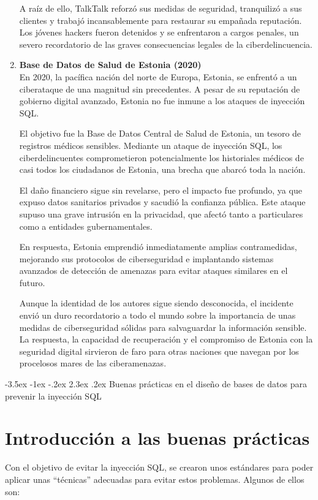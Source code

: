 \documentclass[11pt]{report}
\makeatletter
\renewcommand\chapter{\@startsection{chapter}{0}{\z@}%
    {-3.5ex \@plus -1ex \@minus -.2ex}%
    {2.3ex \@plus.2ex}%
    {\normalfont\Large\bfseries}}
\makeatother
\begin{document}
\begin{enumerate}
  A raíz de ello, TalkTalk reforzó sus medidas de seguridad, tranquilizó a sus clientes y trabajó incansablemente para restaurar su empañada reputación. Los jóvenes
  hackers fueron detenidos y se enfrentaron a cargos penales, un severo recordatorio de las graves consecuencias legales de la ciberdelincuencia.

  \item \textbf{Base de Datos de Salud de Estonia (2020)} \\
  En 2020, la pacífica nación del norte de Europa, Estonia, se enfrentó a un ciberataque de una magnitud sin precedentes. A pesar de su reputación de gobierno digital avanzado,
  Estonia no fue inmune a los ataques de inyección SQL.

  El objetivo fue la Base de Datos Central de Salud de Estonia, un tesoro de registros médicos sensibles. Mediante un ataque de inyección SQL, los ciberdelincuentes comprometieron
  potencialmente los historiales médicos de casi todos los ciudadanos de Estonia, una brecha que abarcó toda la nación.
  
  El daño financiero sigue sin revelarse, pero el impacto fue profundo, ya que expuso datos sanitarios privados y sacudió la confianza pública. Este ataque supuso una grave intrusión
  en la privacidad, que afectó tanto a particulares como a entidades gubernamentales.
  
  En respuesta, Estonia emprendió inmediatamente amplias contramedidas, mejorando sus protocolos de ciberseguridad e implantando sistemas avanzados de detección de amenazas para evitar
  ataques similares en el futuro.
  
  Aunque la identidad de los autores sigue siendo desconocida, el incidente envió un duro recordatorio a todo el mundo sobre la importancia de unas medidas de ciberseguridad sólidas para
  salvaguardar la información sensible. La respuesta, la capacidad de recuperación y el compromiso de Estonia con la seguridad digital sirvieron de faro para otras naciones que navegan por
  los procelosos mares de las ciberamenazas.
  
\end{enumerate}

\cleardoublepage

\chapter{Buenas prácticas en el diseño de bases de datos para prevenir la inyección SQL}
\section{Introducción a las buenas prácticas}
Con el objetivo de evitar la inyección SQL, se crearon unos estándares para poder aplicar unas 
“técnicas” adecuadas para evitar estos problemas. Algunos de ellos son:
\end{document}
